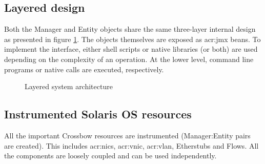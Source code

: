 \documentclass[11pt,openany]{book}
\begin{document}
      \subsection{Layered design}

        Both the Manager and Entity objects share the same three-layer internal design as presented in figure
        \ref{fig:arch:laydes}. The objects themselves are exposed as \gls{acr:jmx} beans. To implement the interface,
        either shell scripts or native libraries (or both) are used depending on the complexity of an operation. At the
        lower level, command line programs or native calls are executed, respectively.

        \begin{figure}[H]
          \begin{center}
          \end{center}

          \caption{Layered system architecture}
          \label{fig:arch:laydes}
        \end{figure}


      \subsection{Instrumented Solaris OS resources}

        All the important Crossbow resources are instrumented (Manager:Entity pairs are created). This includes
        \gls{acr:nic}s, \gls{acr:vnic}, \gls{acr:vlan}, Etherstubs and Flows. All the components are loosely coupled and
        can be used independently.
\end{document}
